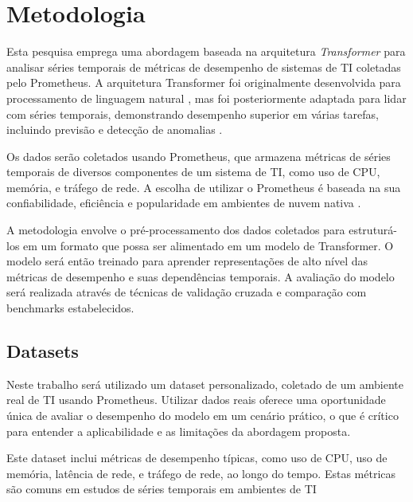 \chapter{Metodologia}

Esta pesquisa emprega uma abordagem baseada na arquitetura \textit{Transformer} para analisar séries temporais de métricas de desempenho de sistemas de TI coletadas pelo Prometheus. A arquitetura Transformer foi originalmente desenvolvida para processamento de linguagem natural \cite{vaswani2017attention}, mas foi posteriormente adaptada para lidar com séries temporais, demonstrando desempenho superior em várias tarefas, incluindo previsão e detecção de anomalias \cite{lim2019temporal}.

Os dados serão coletados usando Prometheus, que armazena métricas de séries temporais de diversos componentes de um sistema de TI, como uso de CPU, memória, e tráfego de rede. A escolha de utilizar o Prometheus é baseada na sua confiabilidade, eficiência e popularidade em ambientes de nuvem nativa \cite{brazil2019prometheus}.

A metodologia envolve o pré-processamento dos dados coletados para estruturá-los em um formato que possa ser alimentado em um modelo de Transformer. O modelo será então treinado para aprender representações de alto nível das métricas de desempenho e suas dependências temporais. A avaliação do modelo será realizada através de técnicas de validação cruzada e comparação com benchmarks estabelecidos.

\section{Datasets}

Neste trabalho será utilizado um dataset personalizado, coletado de um ambiente real de TI usando Prometheus. Utilizar dados reais oferece uma oportunidade única de avaliar o desempenho do modelo em um cenário prático, o que é crítico para entender a aplicabilidade e as limitações da abordagem proposta.

Este dataset inclui métricas de desempenho típicas, como uso de CPU, uso de memória, latência de rede, e tráfego de rede, ao longo do tempo. Estas métricas são comuns em estudos de séries temporais em ambientes de TI 

